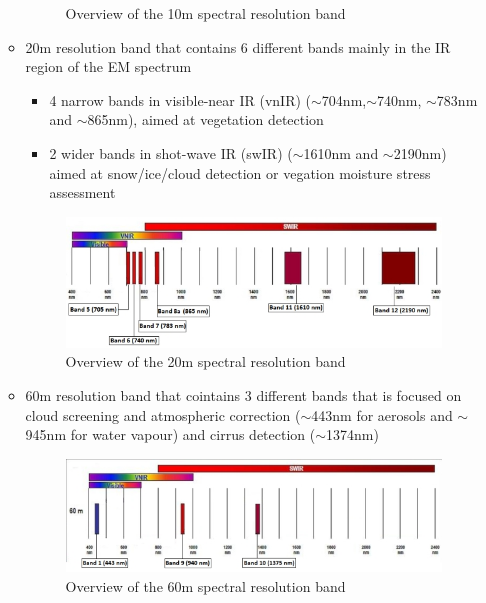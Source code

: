 \begin{itemize}
\begin{itemize}
\begin{figure}[h!]
            \caption{Overview of the 10m spectral resolution band}
        \end{figure}
        \item 20m resolution band that contains 6 different bands mainly in the IR region of the EM spectrum
        \begin{itemize}
            \item 4 narrow bands in visible-near IR (vnIR) ($\sim$704nm,$\sim$740nm, $\sim$783nm and $\sim$865nm), aimed at vegetation detection
            \item 2 wider bands in shot-wave IR (swIR) ($\sim$1610nm and $\sim$2190nm) aimed at snow/ice/cloud detection or vegation moisture stress assessment
        \end{itemize}
        \begin{figure}[h!]
            \centering
            \includegraphics[width=\textwidth]{data_sources/img/sentinel2-bands2.png}
            \caption{Overview of the 20m spectral resolution band}
        \end{figure} 
        \item 60m resolution band that cointains 3 different bands that is focused on cloud screening and atmospheric correction ($\sim$443nm for aerosols and $\sim$945nm for water vapour) and cirrus detection ($\sim$1374nm)
        \begin{figure}[h!]
            \centering
            \includegraphics[width=\textwidth]{data_sources/img/sentinel2-bands3.png}
            \caption{Overview of the 60m spectral resolution band}
        \end{figure}
    \end{itemize}
\end{itemize}
